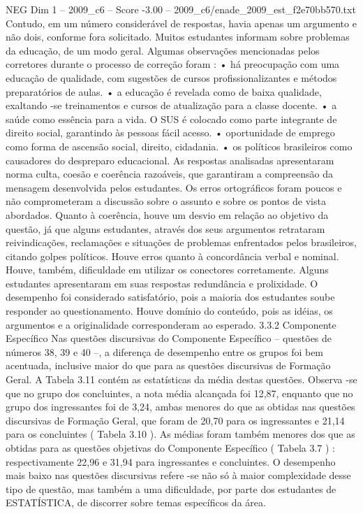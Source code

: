 \begin{textsample}{NEG Dim 1 – 2009\_c6 – Score -3.00 – 2009\_c6/enade\_2009\_est\_f2e70bb570.txt}
Contudo, em um número considerável de respostas, havia apenas um argumento e não dois, conforme fora solicitado.
Muitos estudantes informam sobre problemas da educação, de um modo geral.
Algumas observações mencionadas pelos corretores durante o processo de correção foram : • há preocupação com uma educação de qualidade, com sugestões de cursos profissionalizantes e métodos preparatórios de aulas. • a educação é revelada como de baixa qualidade, exaltando -se treinamentos e cursos de atualização para a classe docente. • a saúde como essência para a vida.
O SUS é colocado como parte integrante de direito social, garantindo às pessoas fácil acesso. • oportunidade de emprego como forma de ascensão social, direito, cidadania. • os políticos brasileiros como causadores do despreparo educacional.
As respostas analisadas apresentaram norma culta, coesão e coerência razoáveis, que garantiram a compreensão da mensagem desenvolvida pelos estudantes.
Os erros ortográficos foram poucos e não comprometeram a discussão sobre o assunto e sobre os pontos de vista abordados.
Quanto à coerência, houve um desvio em relação ao objetivo da questão, já que alguns estudantes, através dos seus argumentos retrataram reivindicações, reclamações e situações de problemas enfrentados pelos brasileiros, citando golpes políticos.
Houve erros quanto à concordância verbal e nominal.
Houve, também, dificuldade em utilizar os conectores corretamente.
Alguns estudantes apresentaram em suas respostas redundância e prolixidade.
O desempenho foi considerado satisfatório, pois a maioria dos estudantes soube responder ao questionamento.
Houve domínio do conteúdo, pois as idéias, os argumentos e a originalidade corresponderam ao esperado. 3.3.2 Componente Específico Nas questões discursivas do Componente Específico – questões de números 38, 39 e 40 –, a diferença de desempenho entre os grupos foi bem acentuada, inclusive maior do que para as questões discursivas de Formação Geral.
A Tabela 3.11 contém as estatísticas da média destas questões.
Observa -se que no grupo dos concluintes, a nota média alcançada foi 12,87, enquanto que no grupo dos ingressantes foi de 3,24, ambas menores do que as obtidas nas questões discursivas de Formação Geral, que foram de 20,70 para os ingressantes e 21,14 para os concluintes ( Tabela 3.10 ).
As médias foram também menores dos que as obtidas para as questões objetivas do Componente Específico ( Tabela 3.7 ) : respectivamente 22,96 e 31,94 para ingressantes e concluintes.
O desempenho mais baixo nas questões discursivas refere -se não só à maior complexidade desse tipo de questão, mas também a uma dificuldade, por parte dos estudantes de ESTATÍSTICA, de discorrer sobre temas específicos da área.

\end{textsample}
